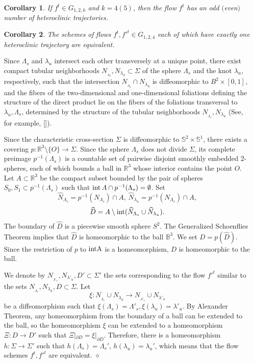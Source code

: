 \documentclass[%
 aip,
 amsmath,amssymb,
preprint,%
]{revtex4-1}
\newtheorem{cor}{Corollary}
\newenvironment{proof}{{\bf Proof:}}
{\hfill $\diamond$\medskip}
\begin{document}
\begin{cor}\label{nmb_of_het} If $f^t\in G_{1,2,k}$ and $k=4(5)$, then the flow $f^t$ has an odd $($even$)$ number of heteroclinic trajectories.
\end{cor}

\begin{cor}\label{inters1} The schemes of flows $f^t, {f'}^t\in G_{1,2,4}$  each of which  have exactly one heteroclinic trajectory  are equivalent.
\end{cor}
\begin{proof} Since $\Lambda_s$ and $\lambda_u$ intersect  each other transversely at a unique point, there exist compact tubular neighborhoods $N_{_{\Lambda_s}}, N_{\lambda_u}\subset \Sigma$ of the sphere $\Lambda_s$ and the knot $\lambda_u$, respectively, such that the intersection $N_{_{\Lambda_s}}\cap N_{\lambda_u}$ is diffeomorphic to $B^2\times [0,1]$, and the fibers of the two-dimensional and one-dimensional foliations defining the structure of the direct product lie on the fibers of the foliations transversal to $\lambda_u, \Lambda_s$, determined by the structure of the tubular neighborhoods $N_{_{\Lambda_s}}, N_{\lambda_u}$ (See, for example, []).

Since the characteristic cross-section $\Sigma$ is diffeomorphic to $\mathbb S^2\times \mathbb S^1$, there exists a covering $p:\mathbb R^3\setminus \{O\}\to \Sigma$. Since the sphere $\Lambda_s$ does not divide $\Sigma$, its complete preimage $p^{-1}(\Lambda_s)$ is a countable set of pairwise disjoint smoothly embedded 2-spheres, each of which bounds a ball in $\mathbb R^3$ whose interior contains the point $O$. Let $A\subset \mathbb R^3$ be the compact subset bounded by the pair of spheres $S_0, S_{1}\subset p^{-1}(\Lambda_s)$ such that ${\rm int}\, A\cap p^{-1}(\Lambda_s)=\emptyset$. Set $$\widehat N_{\Lambda_s}=p^{-1}(N_{\Lambda_s})\cap A,\  \widehat N_{\lambda_u}=p^{-1}(N_{\Lambda_s})\cap A,$$ $$\widehat D=A \setminus {\rm int}(\widehat N_{\Lambda_s}\cup \widehat N_{\lambda_u}).$$ The boundary of $\widehat D$ is a piecewise smooth sphere $S^2$. The Generalized Schoenflies Theorem implies that $\widehat D$ is homeomorphic to the ball $\mathbb B^3$. We set $D=p(\widehat D)$. Since the restriction of $p$ to ${\rm int A}$ is a homeomorphism, $D$ is homeomorphic to the ball.

We denote by $N_{_{\Lambda'_s}}, N_{\lambda'_u}, D'\subset \Sigma'$ the sets corresponding to the flow ${f'}^t$ similar  to the sets $N_{_{\Lambda_s}}, N_{\lambda_u}, D\subset \Sigma$. Let $$\xi: N_{_{\Lambda_s}}\cup  N_{\lambda_u}\to N_{_{\Lambda'_s}}\cup  N_{\lambda'_u}$$ be a diffeomorphism such that
$\xi(\Lambda_s)=\Lambda'_s, \xi(\lambda_u)=\lambda'_u$. By Alexander Theorem, any homeomorphism from the boundary of a ball can be extended to the ball, so the homeomorphism $\xi$ can be extended to a homeomorphism $\Xi:D\to D'$ such that $\Xi|_{\partial D}=\xi|_{\partial D}$. Therefore, there is a homeomorphism $h: \Sigma\to \Sigma'$ such that $h(\Lambda_s)=\Lambda_s'$, $h(\lambda_u)=\lambda_u'$, which means that the flow schemes $f^t, {f'}^t$ are equivalent.
\end{proof}
\end{document}
